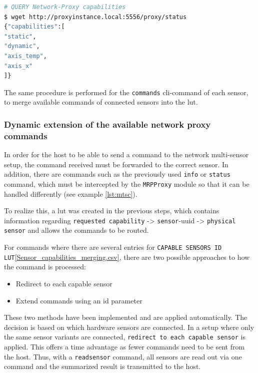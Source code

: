 \begin{lstlisting}[language=bash, caption={MRPproxy REST enpoiint query examples}, label=lst:mtsc]
# QUERY Network-Proxy capabilities
$ wget http://proxyinstance.local:5556/proxy/status
{"capabilities":[
"static",
"dynamic",
"axis_temp",
"axis_x"
]}
\end{lstlisting}

The same procedure is performed for the
\passthrough{\lstinline!commands!} \gls{cli}-command of each sensor, to
merge available commands of connected sensors into the \gls{lut}.

\hypertarget{dynamic-extension-of-the-available-network-proxy-commands}{%
\subsubsection{Dynamic extension of the available network proxy
commands}\label{dynamic-extension-of-the-available-network-proxy-commands}}

In order for the host to be able to send a command to the network
multi-sensor setup, the command received must be forwarded to the
correct sensor. In addition, there are commands such as the previously
used \passthrough{\lstinline!info!} or \passthrough{\lstinline!status!}
command, which must be intercepted by the
\passthrough{\lstinline!MRPProxy!} module so that it can be handled
differently (see example \ref{lst:mtsc}).

To realize this, a \gls{lut} was created in the previous steps, which
contains information regarding
\passthrough{\lstinline!requested capability!} -\textgreater{}
\passthrough{\lstinline!sensor!}-\gls{uuid} -\textgreater{}
\passthrough{\lstinline!physical sensor!} and allows the commands to be
routed.

For commands where there are several entries for
\passthrough{\lstinline!CAPABLE SENSORS ID LUT!}\ref{Sensor_capabilities_merging.csv},
there are two possible approaches to how the command is processed:

\begin{itemize}
\tightlist
\item
  Redirect to each capable sensor
\item
  Extend commands using an id parameter
\end{itemize}

These two methods have been implemented and are applied automatically.
The decision is based on which hardware sensors are connected. In a
setup where only the same sensor variants are connected,
\passthrough{\lstinline!redirect to each capable sensor!} is applied.
This offers a time advantage as fewer commands need to be sent from the
host. Thus, with a \passthrough{\lstinline!readsensor!} command, all
sensors are read out via one command and the summarized result is
transmitted to the host.

